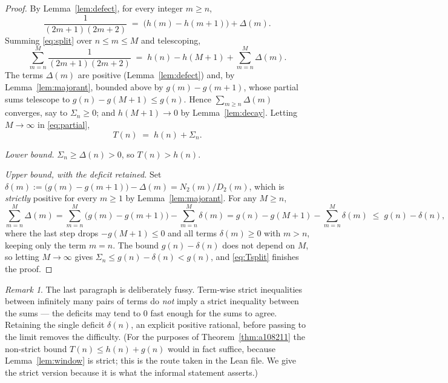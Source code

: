 \documentclass[11pt]{article}
\theoremstyle{plain}
\theoremstyle{definition}
\theoremstyle{remark}
\newtheorem*{remark}{Remark}
\numberwithin{equation}{section}
\begin{document}
\begin{proof}
By Lemma~\ref{lem:defect}, for every integer $m \ge n$,
\begin{equation}
  \frac{1}{(2m+1)(2m+2)} \;=\; \bigl(h(m) - h(m+1)\bigr) + \Delta(m).
  \label{eq:split}
\end{equation}
Summing \eqref{eq:split} over $n \le m \le M$ and telescoping,
\begin{equation}
  \sum_{m=n}^{M} \frac{1}{(2m+1)(2m+2)}
  \;=\; h(n) - h(M+1) + \sum_{m=n}^{M} \Delta(m).
  \label{eq:partial}
\end{equation}
The terms $\Delta(m)$ are positive (Lemma~\ref{lem:defect}) and, by Lemma~\ref{lem:majorant},
bounded above by $g(m)-g(m+1)$, whose partial sums telescope to
$g(n) - g(M+1) \le g(n)$. Hence $\sum_{m \ge n} \Delta(m)$ converges, say to $\Sigma_n \ge 0$;
and $h(M+1) \to 0$ by Lemma~\ref{lem:decay}. Letting $M \to \infty$ in \eqref{eq:partial},
\begin{equation}
  T(n) \;=\; h(n) + \Sigma_n .
  \label{eq:Tsplit}
\end{equation}

\emph{Lower bound.} $\Sigma_n \ge \Delta(n) > 0$, so $T(n) > h(n)$.

\emph{Upper bound, with the deficit retained.} Set
$\delta(m) := \bigl(g(m) - g(m+1)\bigr) - \Delta(m) = N_2(m)/D_2(m)$, which is
\emph{strictly} positive for every $m \ge 1$ by Lemma~\ref{lem:majorant}. For any $M \ge n$,
\[
  \sum_{m=n}^{M} \Delta(m)
  = \sum_{m=n}^{M} \bigl(g(m)-g(m+1)\bigr) - \sum_{m=n}^{M} \delta(m)
  = g(n) - g(M+1) - \sum_{m=n}^{M} \delta(m)
  \;\le\; g(n) - \delta(n),
\]
where the last step drops $-g(M+1) \le 0$ and all terms $\delta(m) \ge 0$ with $m > n$, keeping
only the term $m=n$. The bound $g(n) - \delta(n)$ does not depend on $M$, so letting
$M \to \infty$ gives $\Sigma_n \le g(n) - \delta(n) < g(n)$, and \eqref{eq:Tsplit} finishes the
proof.
\end{proof}

\begin{remark}
The last paragraph is deliberately fussy. Term-wise strict inequalities between infinitely many
pairs of terms do \emph{not} imply a strict inequality between the sums --- the deficits may
tend to $0$ fast enough for the sums to agree. Retaining the single deficit $\delta(n)$, an
explicit positive rational, before passing to the limit removes the difficulty. (For the
purposes of Theorem~\ref{thm:a108211} the non-strict bound $T(n) \le h(n)+g(n)$ would in fact
suffice, because Lemma~\ref{lem:window} is strict; this is the route taken in the Lean file.
We give the strict version because it is what the informal statement asserts.)
\end{remark}
\end{document}
